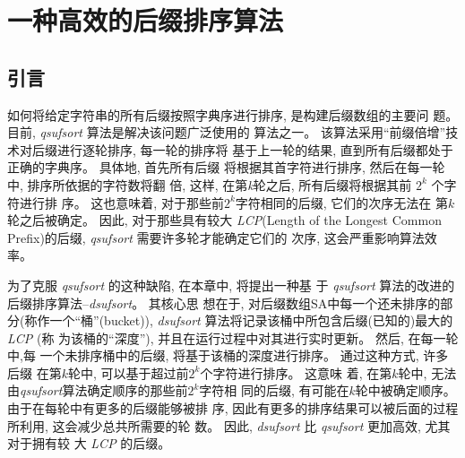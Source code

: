 

\chapter{一种高效的后缀排序算法}
\section{引言}
\label{sec:introduction}

如何将给定字符串的所有后缀按照字典序进行排序, 是构建后缀数组的主要问
题。 目前, \emph{qsufsort}\cite{Larsson2007} 算法是解决该问题广泛使用的
算法之一。 该算法采用“前缀倍增”技术对后缀进行逐轮排序, 每一轮的排序将
基于上一轮的结果, 直到所有后缀都处于正确的字典序。 具体地, 首先所有后缀
将根据其首字符进行排序, 然后在每一轮中, 排序所依据的字符数将翻
倍, 这样, 在第\emph{k}轮之后, 所有后缀将根据其前 $2^{k}$ 个字符进行排
序。 这也意味着, 对于那些前$2^{k}$字符相同的后缀, 它们的次序无法在
第$k$轮之后被确定。 因此, 对于那些具有较大 \emph{LCP}(Length of the
Longest Common Prefix)的后缀, \emph{qsufsort} 需要许多轮才能确定它们的
次序, 这会严重影响算法效率。

为了克服 \emph{qsufsort} 的这种缺陷, 在本章中, 将提出一种基
于 \emph{qsufsort} 算法的改进的后缀排序算法--\emph{dsufsort}。 其核心思
想在于, 对后缀数组SA中每一个还未排序的部分(称作一个“桶”(bucket)),
\emph{dsufsort} 算法将记录该桶中所包含后缀(已知的)最大的\emph{LCP} (称
为该桶的“深度”), 并且在运行过程中对其进行实时更新。 然后, 在每一轮中,每
一个未排序桶中的后缀, 将基于该桶的深度进行排序。 通过这种方式, 许多后缀
在第$k$轮中, 可以基于超过前$2^k$个字符进行排序。 这意味
着, 在第$k$轮中, 无法由\emph{qsufsort}算法确定顺序的那些前$2^{k}$字符相
同的后缀, 有可能在$k$轮中被确定顺序。 由于在每轮中有更多的后缀能够被排
序, 因此有更多的排序结果可以被后面的过程所利用, 这会减少总共所需要的轮
数。 因此, \emph{dsufsort} 比 \emph{qsufsort} 更加高效, 尤其对于拥有较
大 \emph{LCP} 的后缀。

